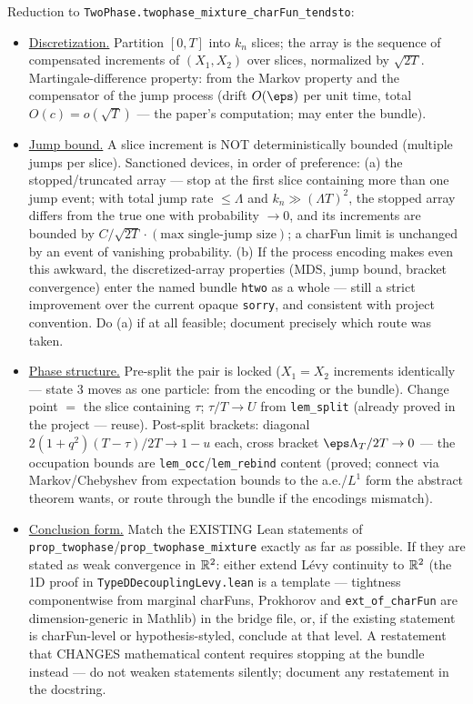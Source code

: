 \documentclass[11pt]{article}
\theoremstyle{plain}
\theoremstyle{remark}
\begin{document}
Reduction to \texttt{TwoPhase.twophase\_mixture\_charFun\_tendsto}:
\begin{itemize}
\item[(1)] \underline{Discretization.} Partition $[0,T]$ into $k_n$ slices; the
array is the sequence of compensated increments of $(X_1,X_2)$ over slices,
normalized by $\sqrt{2T}$. Martingale-difference property: from the Markov
property and the compensator of the jump process (drift $O(\eps)$ per unit
time, total $O(c)=o(\sqrt T)$ --- the paper's computation; may enter the
bundle).
\item[(2)] \underline{Jump bound.} A slice increment is NOT deterministically
bounded (multiple jumps per slice). Sanctioned devices, in order of
preference: (a) the stopped/truncated array --- stop at the first slice
containing more than one jump event; with total jump rate $\le\Lambda$ and
$k_n\gg(\Lambda T)^2$, the stopped array differs from the true one with
probability $\to0$, and its increments are bounded by
$C/\sqrt{2T}\cdot(\text{max single-jump size})$; a charFun limit is unchanged
by an event of vanishing probability. (b) If the process encoding makes even
this awkward, the discretized-array properties (MDS, jump bound, bracket
convergence) enter the named bundle \texttt{htwo} as a whole --- still a
strict improvement over the current opaque \texttt{sorry}, and consistent
with project convention. Do (a) if at all feasible; document precisely
which route was taken.
\item[(3)] \underline{Phase structure.} Pre-split the pair is locked
($X_1=X_2$ increments identically --- state 3 moves as one particle: from the
encoding or the bundle). Change point $=$ the slice containing $\tau$;
$\tau/T\to U$ from \texttt{lem\_split} (already proved in the project ---
reuse). Post-split brackets: diagonal $2(1+q^2)(T-\tau)/2T\to1-u$ each,
cross bracket $\eps\Lambda_T/2T\to0$ --- the occupation bounds are
\texttt{lem\_occ}/\texttt{lem\_rebind} content (proved; connect via
Markov/Chebyshev from expectation bounds to the a.e./$L^1$ form the abstract
theorem wants, or route through the bundle if the encodings mismatch).
\item[(4)] \underline{Conclusion form.} Match the EXISTING Lean statements of
\texttt{prop\_twophase}/\texttt{prop\_twophase\_mixture} exactly as far as
possible. If they are stated as weak convergence in $\mathbb{R}^2$: either extend
L\'evy continuity to $\mathbb{R}^2$ (the 1D proof in
\texttt{TypeDDecouplingLevy.lean} is a template --- tightness componentwise
from marginal charFuns, Prokhorov and \texttt{ext\_of\_charFun} are
dimension-generic in Mathlib) in the bridge file, or, if the existing
statement is charFun-level or hypothesis-styled, conclude at that level. A
restatement that CHANGES mathematical content requires stopping at the
bundle instead --- do not weaken statements silently; document any
restatement in the docstring.
\end{itemize}
\end{document}
